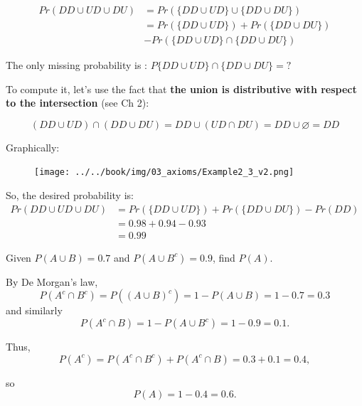 \documentclass[notes=show, handout]{beamer}\usepackage[]{graphicx}\usepackage[]{color}
\begin{document}
\begin{frame}{\secname}
  \begin{example}

  \begin{footnotesize}
  \begin{align*}
  Pr(DD \cup UD \cup DU) &= Pr(\{DD \cup UD\} \cup \{DD \cup DU\})\\
  &= Pr(\{DD \cup UD\}) + Pr(\{DD \cup DU\})\\
  &- Pr(\{DD \cup UD\} \cap \{DD \cup DU\})
  \end{align*}

  The only missing probability is : $P\{DD \cup UD\} \cap \{DD \cup DU\} = ?$

  To compute it, let's use the fact that \textbf{the union is distributive with respect to the intersection} (see Ch 2):

  $$(DD \cup UD) \cap (DD \cup DU) = DD \cup (UD \cap DU) =DD \cup \varnothing = DD$$
  \end{footnotesize}
  \end{example}
\end{frame}

\begin{frame}{\secname}
  \begin{example}
  \begin{footnotesize}
  Graphically:
  \begin{figure}[h!]
  \centering
  \texttt{[image: ../../book/img/03\_axioms/Example2\_3\_v2.png]}
  \end{figure}

  So, the desired probability is:
  \begin{align*}
    Pr(DD \cup UD \cup DU) &= Pr(\{DD \cup UD\}) + Pr(\{DD \cup DU\}) - Pr(DD) \\
    &= 0.98 + 0.94-0.93 \\
    &= 0.99
  \end{align*}
  \end{footnotesize}
  \end{example}
\end{frame}


\begin{frame}{\secname}
  \begin{example}
  \begin{small}
  Given  $P(A\cup B)=0.7$ and $P(A\cup {B}^c) = 0.9$, find $P(A)$.


  \vspace{0.2cm}


  By De Morgan's law,
  $$P(A^c \cap B^c) = P((A\cup B )^c) = 1 - P(A\cup B) = 1 - 0.7 = 0.3$$
  and similarly
  $$P(A^c \cap B) = 1 - P(A \cup B^c) = 1- 0.9 = 0.1.$$

  Thus,
  $$P(A^c)=P(A^c \cap B^c )+P(A^c \cap B)= 0.3+ 0.1= 0.4,$$

  so
  $$P(A)=1 - 0.4= 0.6.$$
  \end{small}
   \end{example}
\end{frame}
\end{document}
